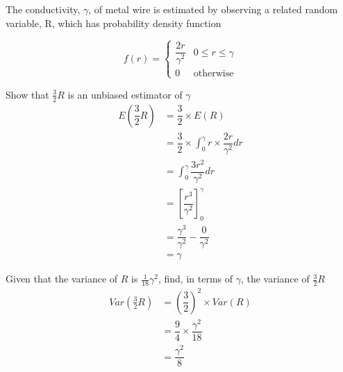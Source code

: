         \begin{example}
        {
            The conductivity, $\gamma$, of metal wire is estimated by observing a related random variable, R, which has probability density function

            $$
            f(r) = 
            \begin{cases}
            \dfrac{2r}{\gamma^2} & 0 \leq r \leq \gamma \\
            0 & \text{otherwise}
            \end{cases}
            $$
        }

            \begin{step}{Show that $\frac{3}{2}R$ is an unbiased estimator of $\gamma$}
                \begin{align*}
                E\left(\dfrac{3}{2}R\right) &= \dfrac{3}{2} \times E(R)                                             \\
                                            &= \dfrac{3}{2} \times \int_0^\gamma r \times \dfrac{2r}{\gamma^2} dr   \\
                                            &= \int_0^\gamma \dfrac{3r^2}{\gamma^2} dr                              \\
                                            &= \left[\dfrac{r^3}{\gamma^2}\right]^\gamma_0                          \\
                                            &= \dfrac{\gamma^3}{\gamma^2} - \dfrac{0}{\gamma^2}                     \\
                                            &= \gamma 
                \end{align*}
            \end{step}

            \begin{step}{Given that the variance of $R$ is $\frac{1}{18}\gamma^2$, find, in terms of $\gamma$, the variance of $\frac{3}{2}R$}
                \begin{align*}
                Var\left(\frac{3}{2}R\right) &= \left(\dfrac{3}{2}\right)^2 \times Var(R)   \\
                                            &= \dfrac{9}{4} \times \dfrac{\gamma^2}{18}      \\
                                            &= \dfrac{\gamma^2}{8}
                \end{align*}
            \end{step}


\end{example}
